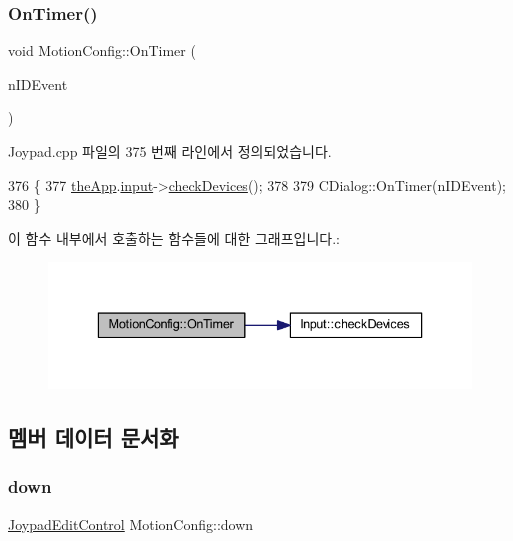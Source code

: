 \subsubsection{\texorpdfstring{On\+Timer()}{OnTimer()}}
{\footnotesize\ttfamily void Motion\+Config\+::\+On\+Timer (\begin{DoxyParamCaption}\item[{U\+I\+N\+T\+\_\+\+P\+TR}]{n\+I\+D\+Event }\end{DoxyParamCaption})\hspace{0.3cm}{\ttfamily [protected]}}



Joypad.\+cpp 파일의 375 번째 라인에서 정의되었습니다.


\begin{DoxyCode}
376 \{
377   \mbox{\hyperlink{_v_b_a_8cpp_a8095a9d06b37a7efe3723f3218ad8fb3}{theApp}}.\mbox{\hyperlink{class_v_b_a_aaab971cb5d67a69e1a26502d15a4dc60}{input}}->\mbox{\hyperlink{class_input_a7a6ef57ff2638f545380618b2d3fdf9d}{checkDevices}}();
378   
379   CDialog::OnTimer(nIDEvent);
380 \}
\end{DoxyCode}
이 함수 내부에서 호출하는 함수들에 대한 그래프입니다.\+:
\nopagebreak
\begin{figure}[H]
\begin{center}
\leavevmode
\includegraphics[width=336pt]{class_motion_config_ac787a62c63e00f55582bb4695bbd04d6_cgraph}
\end{center}
\end{figure}


\subsection{멤버 데이터 문서화}
\mbox{\label{class_motion_config_a0fd0b825d61a2959b3dd20ea3c0fb9ad}} 
\subsubsection{\texorpdfstring{down}{down}}
{\footnotesize\ttfamily \mbox{\hyperlink{class_joypad_edit_control}{Joypad\+Edit\+Control}} Motion\+Config\+::down}



